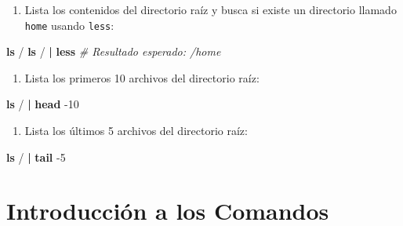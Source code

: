 \documentclass[
]{book}
\newenvironment{Shaded}{\begin{snugshade}}{\end{snugshade}}
\newcommand{\AttributeTok}[1]{\textcolor[rgb]{0.13,0.29,0.53}{#1}}
\newcommand{\CommentTok}[1]{\textcolor[rgb]{0.56,0.35,0.01}{\textit{#1}}}
\newcommand{\FunctionTok}[1]{\textcolor[rgb]{0.13,0.29,0.53}{\textbf{#1}}}
\newcommand{\KeywordTok}[1]{\textcolor[rgb]{0.13,0.29,0.53}{\textbf{#1}}}
\newcommand{\NormalTok}[1]{#1}
\providecommand{\tightlist}{%
  \setlength{\itemsep}{0pt}\setlength{\parskip}{0pt}}
\begin{document}
\begin{enumerate}
\def\labelenumi{\arabic{enumi}.}
\tightlist
\item
  Lista los contenidos del directorio raíz y busca si existe un directorio llamado \texttt{home} usando \texttt{less}:
\end{enumerate}

\begin{Shaded}
\begin{Highlighting}[]
\FunctionTok{ls}\NormalTok{ /}
\FunctionTok{ls}\NormalTok{ / }\KeywordTok{|} \FunctionTok{less}
\CommentTok{\# Resultado esperado: /home}
\end{Highlighting}
\end{Shaded}

\begin{enumerate}
\def\labelenumi{\arabic{enumi}.}
\setcounter{enumi}{1}
\tightlist
\item
  Lista los primeros 10 archivos del directorio raíz:
\end{enumerate}

\begin{Shaded}
\begin{Highlighting}[]
\FunctionTok{ls}\NormalTok{ / }\KeywordTok{|} \FunctionTok{head} \AttributeTok{{-}10}
\end{Highlighting}
\end{Shaded}

\begin{enumerate}
\def\labelenumi{\arabic{enumi}.}
\setcounter{enumi}{2}
\tightlist
\item
  Lista los últimos 5 archivos del directorio raíz:
\end{enumerate}

\begin{Shaded}
\begin{Highlighting}[]
\FunctionTok{ls}\NormalTok{ / }\KeywordTok{|} \FunctionTok{tail} \AttributeTok{{-}5}
\end{Highlighting}
\end{Shaded}

\section{Introducción a los Comandos}\label{introducciuxf3n-a-los-comandos}
\end{document}
